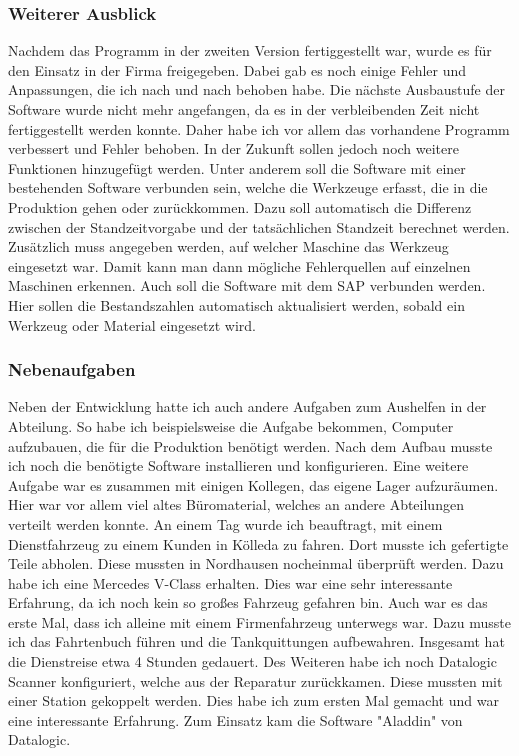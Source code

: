 \documentclass{Vorlage}
\begin{document}
\subsubsection{Weiterer Ausblick}

Nachdem das Programm in der zweiten Version fertiggestellt war, wurde es für den Einsatz in der Firma
freigegeben. Dabei gab es noch einige Fehler und Anpassungen, die ich nach und nach behoben habe. 
Die nächste Ausbaustufe der Software wurde nicht mehr angefangen, da es in der verbleibenden Zeit nicht 
fertiggestellt werden konnte.
Daher habe ich vor allem das vorhandene Programm verbessert und Fehler behoben. In der Zukunft sollen jedoch
noch weitere Funktionen hinzugefügt werden. Unter anderem soll die Software mit einer bestehenden Software
verbunden sein, welche die Werkzeuge erfasst, die in die Produktion gehen oder zurückkommen. Dazu soll 
automatisch die Differenz zwischen der Standzeitvorgabe und der tatsächlichen Standzeit berechnet werden.
Zusätzlich muss angegeben werden, auf welcher Maschine das Werkzeug eingesetzt war. Damit kann man dann
mögliche Fehlerquellen auf einzelnen Maschinen erkennen. Auch soll die Software mit dem SAP verbunden werden.
Hier sollen die Bestandszahlen automatisch aktualisiert werden, sobald ein Werkzeug oder Material eingesetzt
wird.

\subsubsection{Nebenaufgaben}

Neben der Entwicklung hatte ich auch andere Aufgaben zum Aushelfen in der Abteilung. So habe ich 
beispielsweise die Aufgabe bekommen, Computer aufzubauen, die für die Produktion benötigt werden.
Nach dem Aufbau musste ich noch die benötigte Software installieren und konfigurieren. 
Eine weitere Aufgabe war es zusammen mit einigen Kollegen, das eigene Lager aufzuräumen. Hier war
vor allem viel altes Büromaterial, welches an andere Abteilungen verteilt werden konnte.
An einem Tag wurde ich beauftragt, mit einem Dienstfahrzeug zu einem Kunden in Kölleda zu fahren. Dort musste
ich gefertigte Teile abholen. Diese mussten in Nordhausen nocheinmal überprüft werden. Dazu habe ich eine
Mercedes V-Class erhalten. Dies war eine sehr interessante Erfahrung, da ich noch kein so großes Fahrzeug
gefahren bin. Auch war es das erste Mal, dass ich alleine mit einem Firmenfahrzeug unterwegs war. Dazu musste
ich das Fahrtenbuch führen und die Tankquittungen aufbewahren. Insgesamt hat die Dienstreise etwa 4 Stunden
gedauert.
Des Weiteren habe ich noch Datalogic Scanner konfiguriert, welche aus der Reparatur zurückkamen. Diese mussten
mit einer Station gekoppelt werden. Dies habe ich zum ersten Mal gemacht und war eine interessante Erfahrung.
Zum Einsatz kam die Software "Aladdin" von Datalogic.
\end{document}
